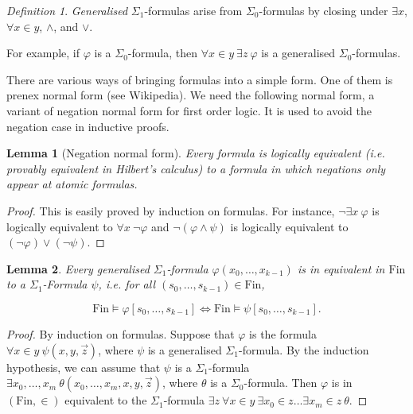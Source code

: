 \documentclass[a4paper, 11pt]{amsart}
\newtheorem{lemma}[lemma]{Lemma}
\theoremstyle{remark}
\newtheorem{definition}[definition]{Definition}
\newcommand{\Fin}{\mathrm{Fin}}
\begin{document}
\begin{definition} 
\emph{Generalised} $\Sigma_1$-formulas arise from $\Sigma_0$-formulas by closing under $\exists x$, $\forall x\in y$, $\wedge$, and $\vee$.  
\end{definition} 

For example, if $\varphi$ is a $\Sigma_0$-formula, then $\forall x\in y\ \exists z\ \varphi$ is a generalised $\Sigma_0$-formulas. 

There are various ways of bringing formulas into a simple form. 
One of them is prenex normal form (see Wikipedia). 
We need the following normal form, a variant of negation normal form for first order logic. 
It is used to avoid the negation case in inductive proofs. 

\begin{lemma}[Negation normal form] 
\label{negation normal form} 
Every formula is logically equivalent (i.e. provably equivalent in Hilbert's calculus) to a formula in which negations only appear at atomic formulas. 
\end{lemma} 
\begin{proof} 
This is easily proved by induction on formulas. 
For instance, 
$\neg \exists x\ \varphi$ is logically equivalent to $\forall x\ \neg\varphi$ and 
$\neg (\varphi \wedge \psi)$ is logically equivalent to $(\neg \varphi) \vee (\neg \psi)$.  
\end{proof} 

\begin{lemma}
\label{generalised Sigma1-formulas} 
Every generalised $\Sigma_1$-formula $\varphi(x_0,\dots,x_{k-1})$ is in equivalent in $\Fin$ to a $\Sigma_1$-Formula $\psi$, i.e. for all $(s_0,\dots,s_{k-1})\in \Fin$, 

$$\Fin \models \varphi[s_0,\dots,s_{k-1}]  \Longleftrightarrow \Fin \models \psi[s_0,\dots,s_{k-1}].$$ 
\end{lemma} 
\begin{proof} 
By induction on formulas. 
Suppose that $\varphi$ is the formula $\forall x\in y\ \psi(x,y,\vec{z})$, where $\psi$ is a generalised $\Sigma_1$-formula. 
By the induction hypothesis, we can assume that $\psi$ is a $\Sigma_1$-formula $\exists x_0,\dots, x_m\ \theta(x_0,\dots,x_m,x,y,\vec{z})$, where $\theta$ is a $\Sigma_0$-formula. 
Then $\varphi$ is in $(\Fin,\in)$ equivalent to the $\Sigma_1$-formula 
$ \exists z\ \forall x\in y\ \exists x_0\in z \dots \exists x_m \in z\ \theta$. 
\end{proof} 
\end{document}
